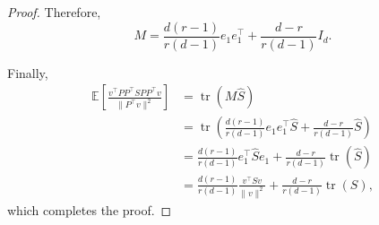 \documentclass[10pt,a4paper]{amsart}
\begin{document}
\begin{proof}
Therefore,
\[
M
= \frac{d(r-1)}{r(d-1)} e_1e_1^\top
+ \frac{d-r}{r(d-1)} I_d.
\]

Finally,
\begin{align*}
\mathbb{E}\!\left[\frac{v^\top PP^\top S PP^\top v}{\|P^\top v\|^2}\right]
&= \operatorname{tr}(M\hat S) \\
&= \operatorname{tr}\!\left(
\frac{d(r-1)}{r(d-1)} e_1e_1^\top \hat S
+ \frac{d-r}{r(d-1)} \hat S
\right) \\
&= \frac{d(r-1)}{r(d-1)} e_1^\top \hat S e_1
+ \frac{d-r}{r(d-1)} \operatorname{tr}(\hat S) \\
&= \frac{d(r-1)}{r(d-1)} \frac{v^\top S v}{\|v\|^2}
+ \frac{d-r}{r(d-1)} \operatorname{tr}(S),
\end{align*}
which completes the proof.
\end{proof}
\end{document}
